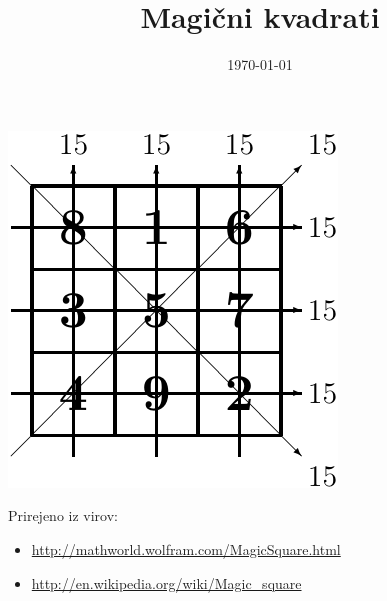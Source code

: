 \documentclass[a4paper,12pt]{article}
\title{Magični kvadrati}
\date{\today}
\begin{document}
\begin{center}
   \includegraphics{slika.pdf}
\end{center}
\maketitle


Prirejeno iz virov:

\begin{itemize}
   \item \url{http://mathworld.wolfram.com/MagicSquare.html}
   \item \url{http://en.wikipedia.org/wiki/Magic_square}
\end{itemize}

\tableofcontents

\end{document}
